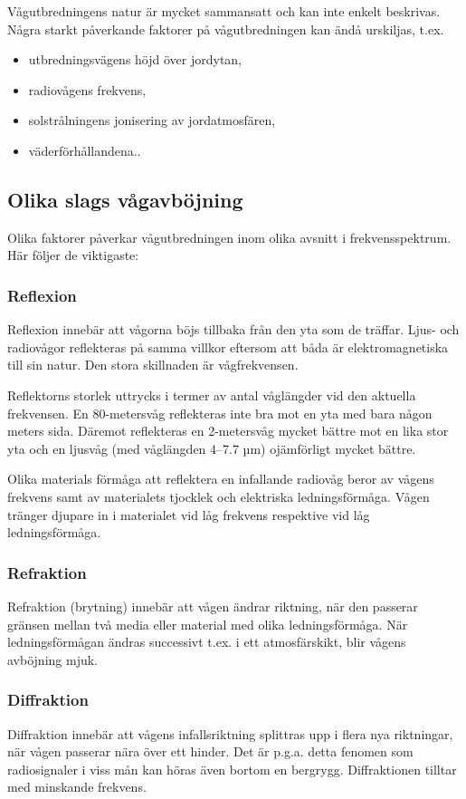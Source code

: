 Vågutbredningens natur är mycket sammansatt och kan inte enkelt
beskrivas. Några starkt påverkande faktorer på vågutbredningen kan
ändå urskiljas, t.ex.
\begin{itemize}
\item utbredningsvägens höjd över jordytan,
\item radiovågens frekvens,
\item solstrålningens jonisering av jordatmosfären,
\item väderförhållandena..
\end{itemize}

\subsection{Olika slags vågavböjning}

Olika faktorer påverkar vågutbredningen inom olika avsnitt i
frekvensspektrum. Här följer de viktigaste:

\subsubsection{Reflexion}

Reflexion innebär att vågorna böjs tillbaka från den yta som de
träffar. Ljus- och radiovågor reflekteras på samma villkor eftersom
att båda är elektromagnetiska till sin natur.  Den stora skillnaden är
vågfrekvensen.

Reflektorns storlek uttrycks i termer av antal våglängder vid den
aktuella frekvensen. En 80-metersvåg reflekteras inte bra mot en yta
med bara någon meters sida.  Däremot reflekteras en 2-metersvåg mycket
bättre mot en lika stor yta och en ljusvåg (med våglängden 4--7.7 µm)
ojämförligt mycket bättre.

Olika materials förmåga att reflektera en infallande radiovåg beror av
vågens frekvens samt av materialets tjocklek och elektriska
ledningsförmåga. Vågen tränger djupare in i materialet vid låg
frekvens respektive vid låg ledningsförmåga.

\subsubsection{Refraktion}

Refraktion (brytning) innebär att vågen ändrar riktning, när den
passerar gränsen mellan två media eller material med olika
ledningsförmåga. När ledningsförmågan ändras successivt t.ex. i ett
atmosfärskikt, blir vågens avböjning mjuk.

\subsubsection{Diffraktion}

Diffraktion innebär att vågens infallsriktning splittras upp i flera
nya riktningar, när vågen passerar nära över ett hinder. Det är p.g.a.
detta fenomen som radiosignaler i viss mån kan höras även bortom en
bergrygg. Diffraktionen tilltar med minskande frekvens.
